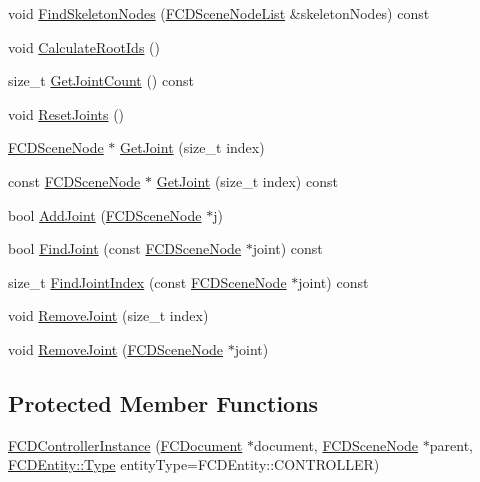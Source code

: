 \begin{DoxyCompactItemize}
\item 
void \hyperlink{classFCDControllerInstance_ae661fba3361f80fe47aadab59639d599}{FindSkeletonNodes} (\hyperlink{classfm_1_1pvector}{FCDSceneNodeList} \&skeletonNodes) const 
\item 
void \hyperlink{classFCDControllerInstance_afe5e7f4cb5ac64a5a502ec83c8f777be}{CalculateRootIds} ()
\item 
size\_\-t \hyperlink{classFCDControllerInstance_ace8f96de6fc8961664b3a8567f669a7e}{GetJointCount} () const 
\item 
void \hyperlink{classFCDControllerInstance_a5439543d2a66269a957abca8f241b156}{ResetJoints} ()
\item 
\hyperlink{classFCDSceneNode}{FCDSceneNode} $\ast$ \hyperlink{classFCDControllerInstance_a9c5d37281dd140d3116e0dcb720f54a6}{GetJoint} (size\_\-t index)
\item 
const \hyperlink{classFCDSceneNode}{FCDSceneNode} $\ast$ \hyperlink{classFCDControllerInstance_abc908d73a16c1d4b4d2f226d90b2889c}{GetJoint} (size\_\-t index) const 
\item 
bool \hyperlink{classFCDControllerInstance_a9c58665f93aea522377627d20178ff73}{AddJoint} (\hyperlink{classFCDSceneNode}{FCDSceneNode} $\ast$j)
\item 
bool \hyperlink{classFCDControllerInstance_a064731e6ebcc97fa3ace04fa067a4ce6}{FindJoint} (const \hyperlink{classFCDSceneNode}{FCDSceneNode} $\ast$joint) const 
\item 
size\_\-t \hyperlink{classFCDControllerInstance_af7cc64b04416e1d04ff2c118398823fc}{FindJointIndex} (const \hyperlink{classFCDSceneNode}{FCDSceneNode} $\ast$joint) const 
\item 
void \hyperlink{classFCDControllerInstance_ab5a40778d93e9bc804127a11e0e184cf}{RemoveJoint} (size\_\-t index)
\item 
void \hyperlink{classFCDControllerInstance_a0be970ad3ce1b2dd92552ae90a1352ca}{RemoveJoint} (\hyperlink{classFCDSceneNode}{FCDSceneNode} $\ast$joint)
\end{DoxyCompactItemize}
\subsection*{Protected Member Functions}
\begin{DoxyCompactItemize}
\item 
\hyperlink{classFCDControllerInstance_a3f7e452b081c7fbbbd3ec5780ce44af0}{FCDControllerInstance} (\hyperlink{classFCDocument}{FCDocument} $\ast$document, \hyperlink{classFCDSceneNode}{FCDSceneNode} $\ast$parent, \hyperlink{classFCDEntity_a9301a4bd5f4d4190ec13e40db4effdd7}{FCDEntity::Type} entityType=FCDEntity::CONTROLLER)
\end{DoxyCompactItemize}
